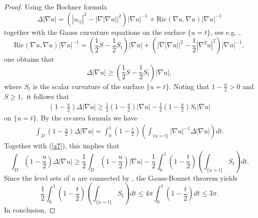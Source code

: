 \documentclass{amsart}
\numberwithin{equation}{section}
\begin{document}
\begin{proof}
Using the Bochner formula 
\begin{equation*}
\Delta \left\vert \nabla u\right\vert =\left( \left\vert u_{ij}\right\vert
^{2}-\left\vert \nabla \left\vert \nabla u\right\vert \right\vert
^{2}\right) \left\vert \nabla u\right\vert ^{-1}+\mathrm{Ric}\left( \nabla
u,\nabla u\right) \left\vert \nabla u\right\vert ^{-1}
\end{equation*}
together with the Gauss curvature equations on the surface $\{u=t\}$, see e.g. \cite{MW},
\begin{equation*}
\mathrm{Ric}\left( \nabla u,\nabla u\right) \left\vert \nabla u\right\vert
^{-1}=\left( \frac{1}{2}S-\frac{1}{2}S_{t }\right) \left\vert \nabla
u\right\vert +\left( \left\vert \nabla \left\vert \nabla u\right\vert
\right\vert ^{2}-\frac{1}{2}\left\vert \nabla ^{2}u\right\vert ^{2}\right)
\left\vert \nabla u\right\vert ^{-1},
\end{equation*}%
one obtains that
\begin{equation*}
\Delta \left\vert \nabla u\right\vert \geq \left( \frac{1}{2}S-\frac{1}{2}%
S_{t}\right) \left\vert \nabla u\right\vert,
\end{equation*}%
where $S_{t}$ is the scalar curvature of the surface $\{u=t\}$. Noting that 
$1-\frac{u}{2}>0$ and $S\geq 1,$ it follows that 
\begin{eqnarray}\label{z7}
\left( 1-\frac{u}{2}\right)\Delta \left\vert \nabla
u\right\vert  \geq \frac{1}{2}\left( 1-\frac{u}{2}\right)
 \left\vert \nabla u\right\vert- \frac{1}{2}\left( 1-\frac{u}{2}\right)
S_{t} \left\vert \nabla u\right\vert
\end{eqnarray}
on $\{u=t\}$. 
By the co-area formula we have
\begin{eqnarray*}
\int_{D}\left( 1-\frac{u}{2}\right) \Delta \left\vert \nabla
u\right\vert=\int_0^1 \left(1-\frac{t}{2}\right)\left(\int_{\{u=t\}} |\nabla u|^{-1}\Delta |\nabla u| \right)dt.
\end{eqnarray*}
Together with (\ref{z7}), this implies that 
\begin{equation*}
\int_D \left( 1-\frac{u}{2}\right)\Delta \left\vert \nabla
u\right\vert  \geq\frac{1}{2}\int_{D}\left( 1-\frac{u}{2}\right)
\left\vert \nabla u\right\vert-\frac{1}{2}\int_0^1 \left(1-\frac{t}{2}\right)\left(\int_{\{u=t\}}S_t\right) dt.
\end{equation*}
Since the level sets of $u$ are connected by \cite{MW}, the Gauss-Bonnet theorem yields 
\begin{equation*}
\frac{1}{2}\int_{0}^{1}\left( 1-\frac{t}{2}\right) \left(
\int_{\{u=t\}}S_{t }\right) dt 
\leq 4\pi \int_{0}^{1}\left( 1-\frac{t}{2}\right) dt
\leq 3\pi.
\end{equation*}
In conclusion,


\end{proof}
\end{document}
